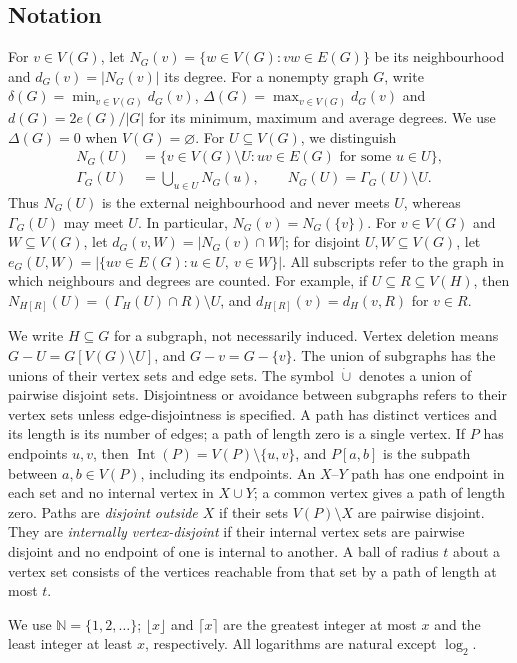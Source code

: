 \documentclass[10pt,letterpaper]{article}
\theoremstyle{definition}
\theoremstyle{remark}
\newcommand{\Int}{\operatorname{Int}}
\newcommand{\dcup}{\mathbin{\dot\cup}}
\begin{document}
\subsection*{Notation}

For $v\in V(G)$, let $N_G(v)=\{w\in V(G):vw\in E(G)\}$ be its neighbourhood and $d_G(v)=|N_G(v)|$ its degree. For a nonempty graph $G$, write $\delta(G)=\min_{v\in V(G)}d_G(v)$, $\Delta(G)=\max_{v\in V(G)}d_G(v)$ and $d(G)=2e(G)/|G|$ for its minimum, maximum and average degrees. We use $\Delta(G)=0$ when $V(G)=\varnothing$. For $U\subseteq V(G)$, we distinguish
\[
\begin{aligned}
N_G(U)&=\{v\in V(G)\setminus U:uv\in E(G)\text{ for some }u\in U\},\\
\Gamma_G(U)&=\bigcup_{u\in U}N_G(u),\qquad N_G(U)=\Gamma_G(U)\setminus U.
\end{aligned}
\]
Thus $N_G(U)$ is the external neighbourhood and never meets $U$, whereas $\Gamma_G(U)$ may meet $U$. In particular, $N_G(v)=N_G(\{v\})$. For $v\in V(G)$ and $W\subseteq V(G)$, let $d_G(v,W)=|N_G(v)\cap W|$; for disjoint $U,W\subseteq V(G)$, let $e_G(U,W)=|\{uv\in E(G):u\in U,\ v\in W\}|$. All subscripts refer to the graph in which neighbours and degrees are counted. For example, if $U\subseteq R\subseteq V(H)$, then $N_{H[R]}(U)=(\Gamma_H(U)\cap R)\setminus U$, and $d_{H[R]}(v)=d_H(v,R)$ for $v\in R$.

We write $H\subseteq G$ for a subgraph, not necessarily induced. Vertex deletion means $G-U=G[V(G)\setminus U]$, and $G-v=G-\{v\}$. The union of subgraphs has the unions of their vertex sets and edge sets. The symbol $\dcup$ denotes a union of pairwise disjoint sets. Disjointness or avoidance between subgraphs refers to their vertex sets unless edge-disjointness is specified. A path has distinct vertices and its length is its number of edges; a path of length zero is a single vertex. If $P$ has endpoints $u,v$, then $\Int(P)=V(P)\setminus\{u,v\}$, and $P[a,b]$ is the subpath between $a,b\in V(P)$, including its endpoints. An $X$--$Y$ path has one endpoint in each set and no internal vertex in $X\cup Y$; a common vertex gives a path of length zero. Paths are \emph{disjoint outside $X$} if their sets $V(P)\setminus X$ are pairwise disjoint. They are \emph{internally vertex-disjoint} if their internal vertex sets are pairwise disjoint and no endpoint of one is internal to another. A ball of radius $t$ about a vertex set consists of the vertices reachable from that set by a path of length at most $t$.

We use $\mathbb N=\{1,2,\ldots\}$; $\lfloor x\rfloor$ and $\lceil x\rceil$ are the greatest integer at most $x$ and the least integer at least $x$, respectively. All logarithms are natural except $\log_2$. 
\end{document}
